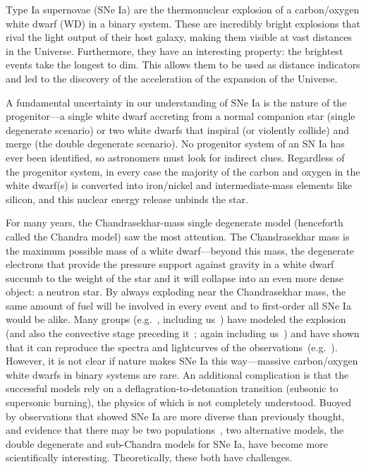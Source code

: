 Type Ia supernovae (SNe Ia) are the thermonuclear explosion of a  
carbon/oxygen white dwarf (WD) in a binary system.  These are incredibly
bright explosions that rival the light output of their host galaxy,
making them visible at vast distances in the Universe.  Furthermore,
they have an interesting property: the brightest events take the
longest to dim.  This allows them to be used as distance indicators
and led to the discovery of the acceleration of the expansion of the
Universe. 

A fundamental uncertainty in our understanding of SNe Ia is the nature
of the progenitor---a single white dwarf accreting from a normal
companion star (single degenerate scenario) or two white dwarfs that
inspiral (or violently collide) and merge (the double degenerate
scenario).  No progenitor system of an SN Ia has ever been
identified, so astronomers must look for indirect clues.  Regardless
of the progenitor system, in every case the majority of the carbon and
oxygen in the white dwarf(s) is converted into iron/nickel and
intermediate-mass elements like silicon, and this nuclear energy
release unbinds the star.

For many years, the Chandrasekhar-mass single degenerate model
(henceforth called the Chandra model) saw the most attention.  The
Chandrasekhar mass is the maximum possible mass of a white
dwarf---beyond this mass, the degenerate electrons that provide the
pressure support against gravity in a white dwarf succumb to the
weight of the star and it will collapse into an even more dense
object: a neutron star.  By always exploding near the Chandrasekhar
mass, the same amount of fuel will be involved in every event and to
first-order all SNe Ia would be alike.  Many groups
(e.g.~\cite{gamezo:2005,Roe07,Jor08}, including us~\cite{Kru12,Ma13})
have modeled the explosion (and also the convective stage
preceding it~\cite{hoflichstein:2002}; again including us~\cite{Non12}) and have shown that it can reproduce the
spectra and lightcurves of the observations~(e.g.~\cite{Blo11}).
However, it is not clear if nature makes SNe Ia this way---massive
carbon/oxygen white dwarfs in binary systems are rare.  An additional
complication is that the successful models rely on a
deflagration-to-detonation transition (subsonic to supersonic
burning), the physics of which is not completely understood.  Buoyed by
observations that showed SNe Ia are more diverse than previously
thought, and evidence that there may be two
populations~\cite{MannucciEtAl06,howelletal+09,How11}, two
alternative models, the double
degenerate and sub-Chandra models for SNe Ia, have become more
scientifically interesting.  Theoretically, these both have
challenges.

